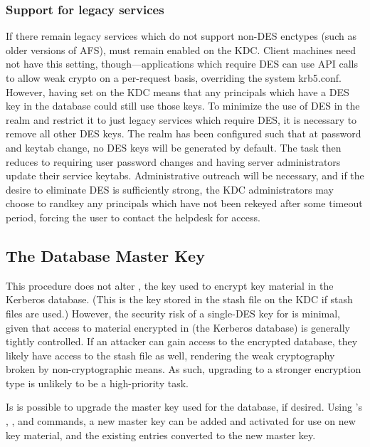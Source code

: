 \documentclass[letterpaper,10pt,english]{sphinxmanual}
\begin{document}
\subsubsection{Support for legacy services}
\label{\detokenize{admin/advanced/retiring-des:support-for-legacy-services}}
If there remain legacy services which do not support non-DES enctypes
(such as older versions of AFS),  must remain
enabled on the KDC.  Client machines need not have this setting,
though—applications which require DES can use API calls to allow
weak crypto on a per-request basis, overriding the system krb5.conf.
However, having  set on the KDC means that any
principals which have a DES key in the database could still use those
keys.  To minimize the use of DES in the realm and restrict it to just
legacy services which require DES, it is necessary to remove all other
DES keys.  The realm has been configured such that at password and
keytab change, no DES keys will be generated by default.  The task
then reduces to requiring user password changes and having server
administrators update their service keytabs.  Administrative outreach
will be necessary, and if the desire to eliminate DES is sufficiently
strong, the KDC administrators may choose to randkey any principals
which have not been rekeyed after some timeout period, forcing the
user to contact the helpdesk for access.


\subsection{The Database Master Key}
\label{\detokenize{admin/advanced/retiring-des:the-database-master-key}}
This procedure does not alter , the key used to encrypt key
material in the Kerberos database.  (This is the key stored in the stash file
on the KDC if stash files are used.)  However, the security risk of
a single-DES key for  is minimal, given that access to material
encrypted in  (the Kerberos database) is generally tightly controlled.
If an attacker can gain access to the encrypted database, they likely
have access to the stash file as well, rendering the weak cryptography
broken by non-cryptographic means.  As such, upgrading  to a stronger
encryption type is unlikely to be a high-priority task.

Is is possible to upgrade the master key used for the database, if
desired.  Using {\hyperref[\detokenize{admin/admin_commands/kdb5_util:kdb5-util-8}]{}}’s , , and
 commands, a new master key can be added
and activated for use on new key material, and the existing entries
converted to the new master key.
\end{document}
